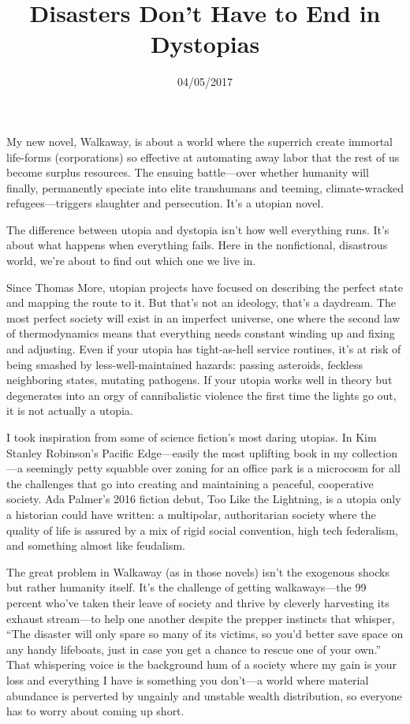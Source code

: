 \documentclass{article}
\title{Disasters Don’t Have to End in Dystopias}
\date{04/05/2017}
\begin{document}
\maketitle


My new novel, Walkaway, is about a world where the super­rich create immortal life-forms (corporations) so effective at automating away labor that the rest of us become surplus resources. The ensuing battle—over whether humanity will finally, permanently speciate into elite transhumans and teeming, climate-wracked refugees—triggers slaughter and persecution. It’s a utopian novel.

The difference between utopia and dystopia isn’t how well everything runs. It’s about what happens when everything fails. Here in the nonfictional, disastrous world, we’re about to find out which one we live in.

Since Thomas More, utopian projects have focused on describing the perfect state and mapping the route to it. But that’s not an ideology, that’s a daydream. The most perfect society will exist in an imperfect universe, one where the second law of thermodynamics means that everything needs constant winding up and fixing and adjusting. Even if your utopia has tight-as-hell service routines, it’s at risk of being smashed by less-well-maintained hazards: passing aster­oids, feckless neighboring states, mutating pathogens. If your utopia works well in theory but degenerates into an orgy of cannibalistic violence the first time the lights go out, it is not actually a utopia.

I took inspiration from some of science fiction’s most daring utopias. In Kim Stanley Robinson’s Pacific Edge—easily the most uplifting book in my collection—a seemingly petty squabble over zoning for an office park is a microcosm for all the challenges that go into creating and maintaining a peaceful, cooperative society. Ada Palmer’s 2016 fiction debut, Too Like the Lightning, is a utopia only a historian could have written: a multi­polar, authoritarian society where the quality of life is assured by a mix of rigid social convention, high tech federalism, and something almost like feudalism.

The great problem in Walkaway (as in those novels) isn’t the exogenous shocks but rather humanity itself. It’s the challenge of getting walkaways—the 99 percent who’ve taken their leave of society and thrive by cleverly harvesting its exhaust stream—to help one another despite the prepper instincts that whisper, “The disaster will only spare so many of its victims, so you’d better save space on any handy lifeboats, just in case you get a chance to rescue one of your own.” That whispering voice is the background hum of a society where my gain is your loss and everything I have is something you don’t—a world where material abundance is perverted by ungainly and unstable wealth distribution, so everyone has to worry about coming up short.
\end{document}
